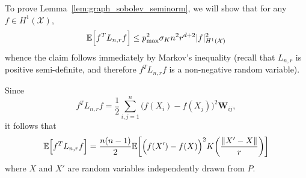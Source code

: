 \documentclass[twoside]{article}
\newcommand{\1}{\mathbf{1}}
\newcommand{\Lap}{L}
\newcommand{\Xset}{\mathcal{X}}
\newcommand{\Ebb}{\mathbb{E}}
\theoremstyle{definition}
\theoremstyle{remark}
\begin{document}
To prove Lemma~\ref{lem:graph_sobolev_seminorm}, we will show that for any $f \in H^1(\Xset)$,
\begin{equation*}
\Ebb\Bigl[f^T \Lap_{n,r} f\Bigr] \leq p_{\max}^2 \sigma_K n^2 r^{d + 2} |f|_{H^1(\Xset)}^2
\end{equation*}
whence the claim follows immediately by Markov's inequality (recall that $\Lap_{n,r}$ is positive semi-definite, and therefore $f^T \Lap_{n,r} f$ is a non-negative random variable).

Since
\begin{equation*}
f^T \Lap_{n,r} f = \frac{1}{2}\sum_{i, j = 1}^{n} \bigl(f(X_i) - f(X_j)\bigr)^2 \mathbf{W}_{ij},
\end{equation*}
it follows that
\begin{equation}
\label{pf:first_order_graph_sobolev_seminorm_1}
\Ebb\Bigl[f^T \Lap_{n,r} f\Bigr] = \frac{n(n - 1)}{2} \Ebb\biggl[\Bigl(f(X') - f(X)\Bigr)^2 K\biggl(\frac{\|X' - X\|}{r}\biggr)\biggr]
\end{equation}
where $X$ and $X'$ are random variables independently drawn from $P$. 
\end{document}
